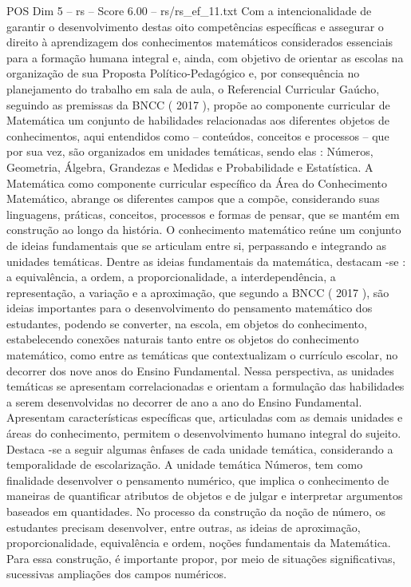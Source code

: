 \begin{textsample}{POS Dim 5 – rs – Score 6.00 – rs/rs\_ef\_11.txt}
Com a intencionalidade de garantir o desenvolvimento destas oito competências específicas e assegurar o direito à aprendizagem dos conhecimentos matemáticos considerados essenciais para a formação humana integral e, ainda, com objetivo de orientar as escolas na organização de sua Proposta Político-Pedagógico e, por consequência no planejamento do trabalho em sala de aula, o Referencial Curricular Gaúcho, seguindo as premissas da BNCC ( 2017 ), propõe ao componente curricular de Matemática um conjunto de habilidades relacionadas aos diferentes objetos de conhecimentos, aqui entendidos como – conteúdos, conceitos e processos – que por sua vez, são organizados em unidades temáticas, sendo elas : Números, Geometria, Álgebra, Grandezas e Medidas e Probabilidade e Estatística.
A Matemática como componente curricular específico da Área do Conhecimento Matemático, abrange os diferentes campos que a compõe, considerando suas linguagens, práticas, conceitos, processos e formas de pensar, que se mantém em construção ao longo da história.
O conhecimento matemático reúne um conjunto de ideias fundamentais que se articulam entre si, perpassando e integrando as unidades temáticas.
Dentre as ideias fundamentais da matemática, destacam -se : a equivalência, a ordem, a proporcionalidade, a interdependência, a representação, a variação e a aproximação, que segundo a BNCC ( 2017 ), são ideias importantes para o desenvolvimento do pensamento matemático dos estudantes, podendo se converter, na escola, em objetos do conhecimento, estabelecendo conexões naturais tanto entre os objetos do conhecimento matemático, como entre as temáticas que contextualizam o currículo escolar, no decorrer dos nove anos do Ensino Fundamental.
Nessa perspectiva, as unidades temáticas se apresentam correlacionadas e orientam a formulação das habilidades a serem desenvolvidas no decorrer de ano a ano do Ensino Fundamental.
Apresentam características específicas que, articuladas com as demais unidades e áreas do conhecimento, permitem o desenvolvimento humano integral do sujeito.
Destaca -se a seguir algumas ênfases de cada unidade temática, considerando a temporalidade de escolarização.
A unidade temática Números, tem como finalidade desenvolver o pensamento numérico, que implica o conhecimento de maneiras de quantificar atributos de objetos e de julgar e interpretar argumentos baseados em quantidades.
No processo da construção da noção de número, os estudantes precisam desenvolver, entre outras, as ideias de aproximação, proporcionalidade, equivalência e ordem, noções fundamentais da Matemática.
Para essa construção, é importante propor, por meio de situações significativas, sucessivas ampliações dos campos numéricos.

\end{textsample}

